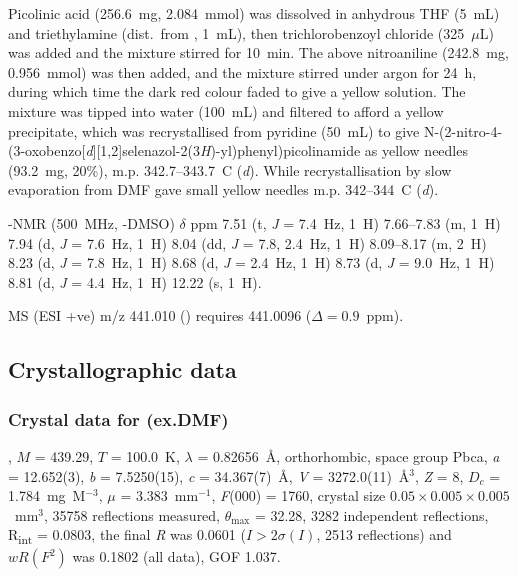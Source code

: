 \begin{refsection}
    Picolinic acid (256.6~mg, 2.084~mmol) was dissolved in anhydrous THF (5~mL) and triethylamine (dist.\ from , 1~mL), then trichlorobenzoyl chloride (325~$\mu$L) was added and the mixture stirred for 10~min.
    The above nitroaniline  (242.8~mg, 0.956~mmol) was then added, and the mixture stirred under argon for 24~h, during which time the dark red colour faded to give a yellow solution.
    The mixture was tipped into water (100~mL) and filtered to afford a yellow precipitate, which was recrystallised from pyridine (50~mL) to give  N-(2-nitro-4-(3-oxobenzo[\emph{d}][1,2]selenazol-2(3\emph{H})-yl)phenyl)picolinamide  as yellow needles (93.2~mg, 20\%), m.p. 342.7--343.7~\degree{}C (\emph{d}).
    While recrystallisation by slow evaporation from DMF gave small yellow needles m.p. 342--344~\degree{}C (\emph{d}).
    
    -NMR (500~MHz, -DMSO) $\delta$ ppm
    7.51 (t, \textit{J} = 7.4~Hz, 1~H) 7.66--7.83 (m, 1~H) 7.94 (d, \textit{J} = 7.6~Hz, 1~H) 8.04 (dd, \textit{J} = 7.8, 2.4~Hz, 1~H) 8.09--8.17 (m, 2~H) 8.23 (d, \textit{J} = 7.8~Hz, 1~H) 8.68 (d, \textit{J} = 2.4~Hz, 1~H) 8.73 (d, \textit{J} = 9.0~Hz, 1~H) 8.81 (d, \textit{J} = 4.4~Hz, 1~H) 12.22 (s, 1~H).
    
    MS (ESI +ve) m/z 441.010 ()  requires 441.0096 ($\Delta=0.9$~ppm).
    
    
    \subsection{Crystallographic data}
    
    \subsubsection{Crystal data for \texorpdfstring{(ex.DMF)}{C19H12N4O4Se}}
    , $M$ = 439.29, $T$ = 100.0~K, $\lambda$ = 0.82656~\AA, orthorhombic, space group Pbca, \emph{a} = 12.652(3), \emph{b} = 7.5250(15), \emph{c} = 34.367(7)~\AA, \emph{V} = 3272.0(11)~\AA$^3$, \emph{Z} = 8, $D_c$ = 1.784~mg~M$^{-3}$, $\mu$ = 3.383~mm$^{-1}$, \emph{F}(000) = 1760, crystal size $0.05 \times 0.005 \times 0.005$~mm$^3$, 35758 reflections measured, $\theta_{\max}$ = 32.28\degree{}, 3282 independent reflections, R\textsubscript{int} = 0.0803, the final \emph{R} was 0.0601 ($I > 2\sigma(I)$, 2513 reflections) and $wR(F^2)$ was 0.1802 (all data), GOF 1.037.
    

\end{refsection}
